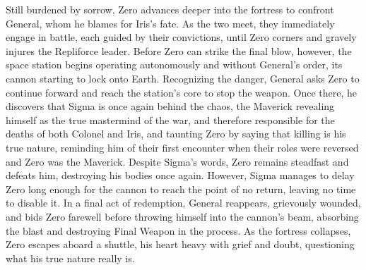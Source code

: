 Still burdened by sorrow, Zero advances deeper into the fortress to confront General, whom he blames for Iris’s fate. As the two meet, they immediately engage in battle, each guided by their convictions, until Zero corners and gravely injures the Repliforce leader. Before Zero can strike the final blow, however, the space station begins operating autonomously and without General's order, its cannon starting to lock onto Earth. Recognizing the danger, General asks Zero to continue forward and reach the station's  core to stop the weapon. Once there, he discovers that Sigma is once again behind the chaos, the Maverick revealing himself as the true mastermind of the war, and therefore responsible for the deaths of both Colonel and Iris, and taunting Zero by saying that killing is his true nature, reminding him of their first encounter when their roles were reversed and Zero was the Maverick. Despite Sigma’s words, Zero remains steadfast and defeats him, destroying his bodies once again.  However, Sigma manages to delay Zero long enough for the cannon to reach the point of no return, leaving no time to disable it. In a final act of redemption, General reappears, grievously wounded, and bids Zero farewell before throwing himself into the cannon’s beam, absorbing the blast and destroying Final Weapon in the process. As the fortress collapses, Zero escapes aboard a shuttle, his heart heavy with grief and doubt,  questioning what his true nature really is. 

